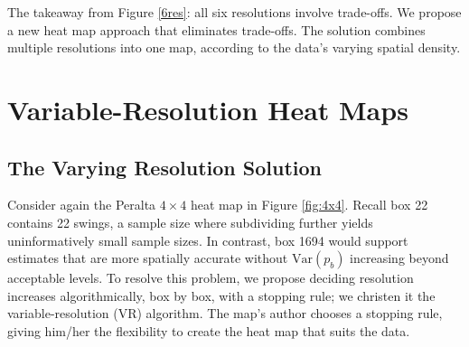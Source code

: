 The takeaway from Figure \ref{6res}: all six resolutions involve trade-offs. We propose a new heat map approach that eliminates trade-offs. The solution combines multiple resolutions into one map, according to the data's varying spatial density.

\section{Variable-Resolution Heat Maps} 

\subsection{The Varying Resolution Solution}

Consider again the Peralta $4 \times 4$ heat map in Figure \ref{fig:4x4}. Recall box 22 contains 22 swings, a sample size where subdividing further yields uninformatively small sample sizes. In contrast, box 1694 would support estimates that are more spatially accurate without $\text{Var}(p_{b})$ increasing beyond acceptable levels. To resolve this problem, we propose deciding resolution increases algorithmically, box by box, with a stopping rule; we christen it the variable-resolution (VR) algorithm. The map's author chooses a stopping rule, giving him/her the flexibility to create the heat map that suits the data. 

